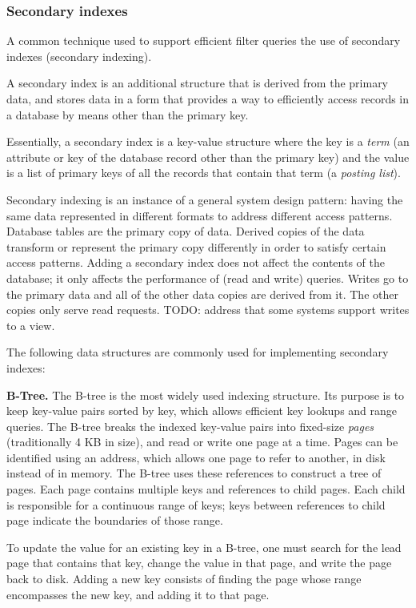 \subsubsection{Secondary indexes}

A common technique used to support efficient filter queries the use of secondary indexes (secondary indexing).

A secondary index is an additional structure that is derived from the primary data, and stores data in a form that
provides a way to efficiently access records in a database by means other than the primary key.

Essentially, a secondary index is a key-value structure where the key is a \textit{term} (an attribute or key of the
database record other than the primary key) and the
value is a list of primary keys of all the records that contain that term (a \textit{posting list}).

Secondary indexing is an instance of a general system design pattern:
having the same data represented in different formats to address different access patterns.
Database tables are the primary copy of data.
Derived copies of the data transform or represent the primary copy differently in order to satisfy certain access patterns.
Adding a secondary index does not affect the contents of the database; it only affects the performance of (read and write)
queries.
Writes go to the primary data and all of the other data copies are derived from it.
The other copies only serve read requests.
TODO: address that some systems support writes to a view.

The following data structures are commonly used for implementing secondary indexes:

\medskip
\noindent
\textbf{B-Tree.}
The B-tree is the most widely used indexing structure.
Its purpose is to keep key-value pairs sorted by key, which allows efficient key lookups and range queries.
The B-tree breaks the indexed key-value pairs into fixed-size  \textit{pages} (traditionally 4 KB in size),
and read or write one page at a time.
Pages can be identified using an address, which allows one page to refer to another, in disk instead of in memory.
The B-tree uses these references to construct a tree of pages.
Each page contains multiple keys and references to child pages.
Each child is responsible for a continuous range of keys; keys between references to child page indicate the boundaries
of those range.

To update the value for an existing key in a B-tree, one must search for the lead page that contains that key,
change the value in that page, and write the page back to disk.
Adding a new key consists of finding the page whose range encompasses the new key, and adding it to that page.

